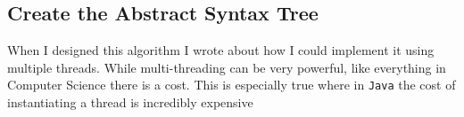 \documentclass[../../../../main.tex]{subfiles}
\begin{document}
\subsection{Create the Abstract Syntax Tree}
When I designed this algorithm I wrote about how I could implement it using multiple threads. While multi-threading can be very powerful, like everything in Computer Science there is a cost. This is especially true where in \texttt{Java} the cost of instantiating a thread\cite{threadCreationJava} is incredibly expensive
\newpage
\end{document}
